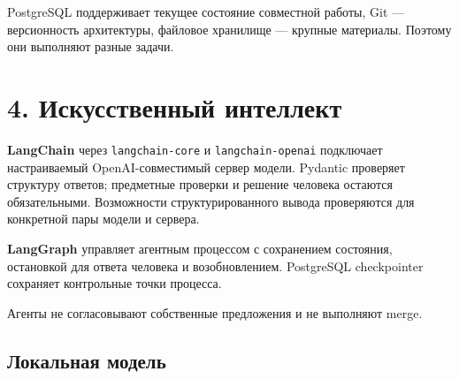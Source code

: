 \documentclass[11pt,a4paper]{article}
\begin{document}
PostgreSQL поддерживает текущее состояние совместной работы, Git --- версионность архитектуры, файловое хранилище --- крупные материалы. Поэтому они выполняют разные задачи.

\clearpage

\section{4. Искусственный интеллект}\label{4-ux438ux441ux43aux443ux441ux441ux442ux432ux435ux43dux43dux44bux439-ux438ux43dux442ux435ux43bux43bux435ux43aux442}

\textbf{LangChain} через \texttt{langchain-core} и \texttt{langchain-openai} подключает настраиваемый OpenAI-совместимый сервер модели. Pydantic проверяет структуру ответов; предметные проверки и решение человека остаются обязательными. Возможности структурированного вывода проверяются для конкретной пары модели и сервера.

\textbf{LangGraph} управляет агентным процессом с сохранением состояния, остановкой для ответа человека и возобновлением. PostgreSQL checkpointer сохраняет контрольные точки процесса.


Агенты не согласовывают собственные предложения и не выполняют merge.

\subsection{Локальная модель}\label{ux43bux43eux43aux430ux43bux44cux43dux430ux44f-ux43cux43eux434ux435ux43bux44c}
\end{document}
